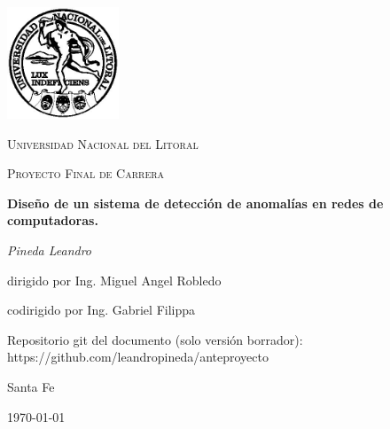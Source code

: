 \documentclass[a4paper,10pt, oneside]{book}
\begin{document}
\begin{titlepage}
	\centering
	\includegraphics[width=0.25\textwidth]{Universidad_del_Litoral}\par\vspace{1cm}
	{\scshape\LARGE Universidad Nacional del Litoral \par}
	\vspace{1cm}
	{\scshape\Large Proyecto Final de Carrera\par}
	\vspace{1.5cm}
	{\huge\bfseries Diseño de un sistema de detección de anomalías en redes de computadoras.\par}
	\vspace{2cm}
	{\Large\itshape Pineda Leandro\par}
	\vfill
	dirigido por Ing. Miguel Angel Robledo\par
	codirigido por Ing. Gabriel Filippa
	

	\vfill
	
	Repositorio git del documento (solo versión borrador): https://github.com/leandropineda/anteproyecto
	
	\vfill
	
	\large Santa Fe\par
	{\large \today\par}
	
\end{titlepage}

\modulolinenumbers[5]

%


%
\newpage
 
\nocite{*}
\printbibliography
\end{document}
